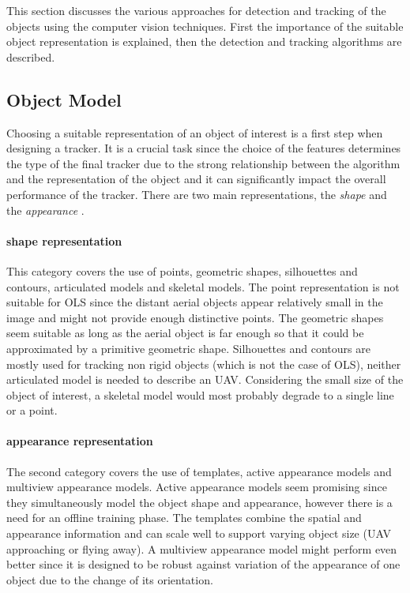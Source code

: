 This section discusses the various approaches for detection and tracking of the objects using the computer vision techniques. First the importance of the suitable object representation is explained, then the detection and tracking algorithms are described.

\subsection{Object Model}

Choosing a suitable representation of an object of interest is a first step when designing a tracker. It is a crucial task since the choice of the features determines the type of the final tracker due to the strong relationship between the algorithm and the representation of the object and it can significantly impact the overall performance of the tracker. There are two main representations, the \textit{shape} and the \textit{appearance} \cite{Yilmaz:2006:OTS:1177352.1177355}.

\paragraph{shape representation} 
This category covers the use of points, geometric shapes, silhouettes and contours, articulated models and skeletal models. The point representation is not suitable for OLS since the distant aerial objects appear relatively small in the image and might not provide enough distinctive points. The geometric shapes seem suitable as long as the aerial object is far enough so that it could be approximated by a primitive geometric shape. Silhouettes and contours are mostly used for tracking non rigid objects (which is not the case of OLS), neither articulated model is needed to describe an UAV. Considering the small size of the object of interest, a skeletal model would most probably degrade to a single line or a point.

\paragraph{appearance representation} 
The second category covers the use of templates, active appearance models and multiview appearance models. Active appearance models seem promising since they simultaneously model the object shape and appearance, however there is a need for an offline training phase. The templates combine the spatial and appearance information and can scale well to support varying object size (UAV approaching or flying away). A multiview appearance model might perform even better since it is designed to be robust against variation of the appearance of one object due to the change of its orientation.

